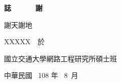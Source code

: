
\begin{CJK*}{UTF8}{bkai}
\begin{center}
\Large
\textbf{誌~~~~~~謝}
\end{center}

\vspace{1cm}
\linespread{2}%
\selectfont
\hspace{0.25cm}

謝天謝地

\vspace{3cm}
\begin{flushright}
XXXXX　於

國立交通大學網路工程研究所碩士班

中華民國 \, 108 年 \, 8 \,月
\end{flushright}
\end{CJK*}
